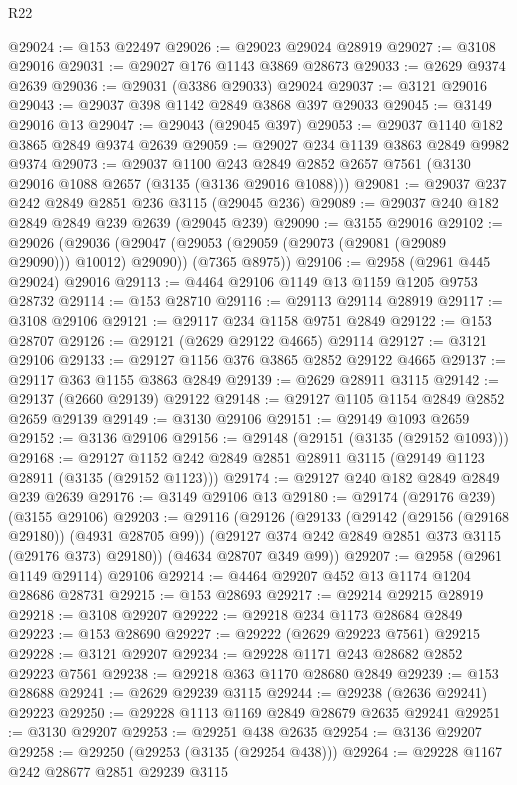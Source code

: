 \begin{lexlean}{R22}
\begin{coremodule}
@29024 := @153 @22497
@29026 := @29023 @29024 @28919
@29027 := @3108 @29016
@29031 := @29027 @176 @1143 @3869 @28673
@29033 := @2629 @9374 @2639
@29036 := @29031 (@3386 @29033) @29024
@29037 := @3121 @29016
@29043 := @29037 @398 @1142 @2849 @3868 @397 @29033
@29045 := @3149 @29016 @13
@29047 := @29043 (@29045 @397)
@29053 := @29037 @1140 @182 @3865 @2849 @9374 @2639
@29059 := @29027 @234 @1139 @3863 @2849 @9982 @9374
@29073 := @29037
    @1100
    @243
    @2849
    @2852
    @2657
    @7561
    (@3130 @29016 @1088 @2657 (@3135 (@3136 @29016 @1088)))
@29081 := @29037 @237 @242 @2849 @2851 @236 @3115 (@29045 @236)
@29089 := @29037 @240 @182 @2849 @2849 @239 @2639 (@29045 @239)
@29090 := @3155 @29016
@29102 := @29026
    (@29036
      (@29047 (@29053 (@29059 (@29073 (@29081 (@29089 @29090))) @10012) @29090))
      (@7365 @8975))
@29106 := @2958 (@2961 @445 @29024) @29016
@29113 := @4464 @29106 @1149 @13 @1159 @1205 @9753 @28732
@29114 := @153 @28710
@29116 := @29113 @29114 @28919
@29117 := @3108 @29106
@29121 := @29117 @234 @1158 @9751 @2849
@29122 := @153 @28707
@29126 := @29121 (@2629 @29122 @4665) @29114
@29127 := @3121 @29106
@29133 := @29127 @1156 @376 @3865 @2852 @29122 @4665
@29137 := @29117 @363 @1155 @3863 @2849
@29139 := @2629 @28911 @3115
@29142 := @29137 (@2660 @29139) @29122
@29148 := @29127 @1105 @1154 @2849 @2852 @2659 @29139
@29149 := @3130 @29106
@29151 := @29149 @1093 @2659
@29152 := @3136 @29106
@29156 := @29148 (@29151 (@3135 (@29152 @1093)))
@29168 := @29127 @1152 @242 @2849 @2851 @28911 @3115 (@29149 @1123 @28911 (@3135 (@29152 @1123)))
@29174 := @29127 @240 @182 @2849 @2849 @239 @2639
@29176 := @3149 @29106 @13
@29180 := @29174 (@29176 @239) (@3155 @29106)
@29203 := @29116
    (@29126
      (@29133
        (@29142 (@29156 (@29168 @29180)) (@4931 @28705 @99))
        (@29127 @374 @242 @2849 @2851 @373 @3115 (@29176 @373) @29180))
      (@4634 @28707 @349 @99))
@29207 := @2958 (@2961 @1149 @29114) @29106
@29214 := @4464 @29207 @452 @13 @1174 @1204 @28686 @28731
@29215 := @153 @28693
@29217 := @29214 @29215 @28919
@29218 := @3108 @29207
@29222 := @29218 @234 @1173 @28684 @2849
@29223 := @153 @28690
@29227 := @29222 (@2629 @29223 @7561) @29215
@29228 := @3121 @29207
@29234 := @29228 @1171 @243 @28682 @2852 @29223 @7561
@29238 := @29218 @363 @1170 @28680 @2849
@29239 := @153 @28688
@29241 := @2629 @29239 @3115
@29244 := @29238 (@2636 @29241) @29223
@29250 := @29228 @1113 @1169 @2849 @28679 @2635 @29241
@29251 := @3130 @29207
@29253 := @29251 @438 @2635
@29254 := @3136 @29207
@29258 := @29250 (@29253 (@3135 (@29254 @438)))
@29264 := @29228 @1167 @242 @28677 @2851 @29239 @3115

\end{coremodule}
\end{lexlean}

